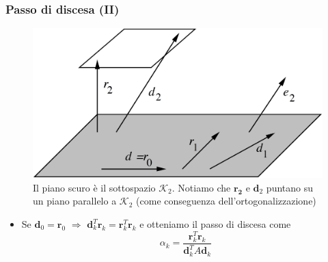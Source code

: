 \documentclass[10pt]{beamer}
\begin{document}
\begin{frame} \frametitle{Passo di discesa (II)}
\begin{figure}
    \centering
    \includegraphics[width=.75\linewidth]{cg_ort.png}
    \caption{Il piano scuro è il sottospazio $\mathcal{K}_2$. Notiamo che $\mathbf{r_2}$ e $\mathbf{d}_2$ puntano su un piano parallelo a $\mathcal{K}_2$ (come conseguenza dell'ortogonalizzazione)}
    \label{fig:ortogonalizzazione}
\end{figure}
\begin{itemize}
\item Se $\mathbf{d}_0=\mathbf{r}_0$ $\Rightarrow$  $\mathbf{d}_k^T\mathbf{r}_k=\mathbf{r}_k^T\mathbf{r}_k$ e otteniamo il \alert{passo di discesa} come
$$
\alpha_k=\frac{\mathbf{r}_k^T \mathbf{r}_k}{\mathbf{d}_k^T A \mathbf{d}_k}
$$
\end{itemize}
\end{frame}



    
    
\end{document}
